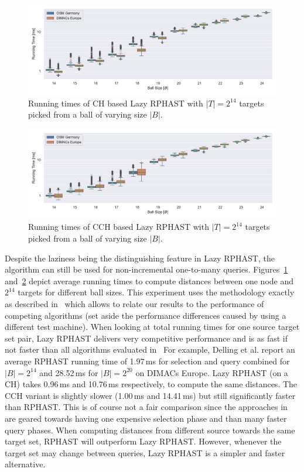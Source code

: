 \documentclass[manuscript,review]{acmart}
\begin{document}
\begin{figure}
\centering
\includegraphics[width=\linewidth]{fig/lazy_rphast_many_to_one.pdf}
\caption{
Running times of CH based Lazy RPHAST with $|T| = 2^{14}$ targets picked from a ball of varying size $|B|$.
}\label{fig:many_to_one}
\end{figure}

\begin{figure}
\centering
\includegraphics[width=\linewidth]{fig/lazy_rphast_cch_many_to_one.pdf}
\caption{
Running times of CCH based Lazy RPHAST with $|T| = 2^{14}$ targets picked from a ball of varying size $|B|$.
}\label{fig:many_to_one_cch}
\end{figure}

Despite the laziness being the distinguishing feature in Lazy RPHAST, the algorithm can still be used for non-incremental one-to-many queries.
Figures~\ref{fig:many_to_one} and~\ref{fig:many_to_one_cch} depict average running times to compute distances between one node and $2^{14}$ targets for different ball sizes.
This experiment uses the methodology exactly as described in~\cite{delling_et_al:OASIcs:2011:3266} which allows to relate our results to the performance of competing algorithms (set aside the performance differences caused by using a different test machine).
When looking at total running times for one source target set pair, Lazy RPHAST delivers very competitive performance and is as fast if not faster than all algorithms evaluated in~\cite{delling_et_al:OASIcs:2011:3266}
For example, Delling et al. report an average RPHAST running time of 1.97\,ms for selection and query combined for $|B| = 2^{14}$ and 28.52\,ms for $|B| = 2^{20}$ on DIMACs Europe.
Lazy RPHAST (on a CH) takes 0.96\,ms and 10.76\,ms respectively, to compute the same distances.
The CCH variant is slightly slower (1.00\,ms and 14.41\,ms) but still significantly faster than RPHAST.
This is of course not a fair comparison since the approaches in~\cite{delling_et_al:OASIcs:2011:3266} are geared towards having one expensive selection phase and than many faster query phases.
When computing distances from different source towards the same target set, RPHAST will outperform Lazy RPHAST.
However, whenever the target set may change between queries, Lazy RPHAST is a simpler and faster alternative.
\end{document}
